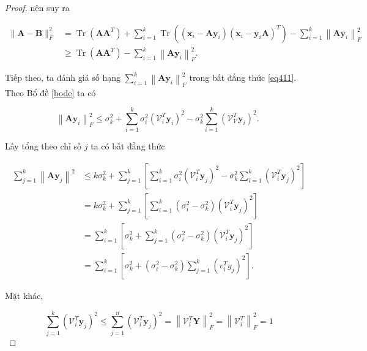 \documentclass[14pt,oneside,a4paper]{report}
\numberwithin{equation}{section}
\begin{document}
\begin{proof}
nên suy ra

\begin{equation} \label{eq411}
	\begin{aligned}
		\|\mathbf{A}-\mathbf{B}\|_{F}^{2} & =\operatorname{Tr}\left(\mathbf{A} \mathbf{A}^{T}\right)+\sum_{i=1}^{k} \operatorname{Tr}\left(\left(\mathbf{x}_{i}-\mathbf{A} \mathbf{y}_{i}\right)\left(\mathbf{x}_{i}-\mathbf{y}_{i} \mathbf{A}\right)^{T}\right)-\sum_{i=1}^{k}\left\|\mathbf{A y}_{i}\right\|_{F}^{2} \\
		& \geqslant \operatorname{Tr}\left(\mathbf{A} \mathbf{A}^{T}\right)-\sum_{i=1}^{k}\left\|\mathbf{A y}_{i}\right\|_{F}^{2} .
	\end{aligned}
\end{equation}

Tiếp theo, ta đánh giá số hạng $\sum_{i=1}^{k}\left\|\mathbf{A y}_{i}\right\|_{F}^{2}$ trong bất đẳng thức \ref{eq411}. Theo Bổ đề \ref{bode} ta có

$$
\left\|\mathbf{A y}_{i}\right\|_{F}^{2} \leqslant \sigma_{k}^{2}+\sum_{i=1}^{k} \sigma_{i}^{2}\left(\mathcal{V}_{i}^{T} \mathbf{y}_{i}\right)^{2}-\sigma_{k}^{2} \sum_{i=1}^{k}\left(\mathcal{V}_{\mathcal{V}}^{T} \mathbf{y}_{i}\right)^{2} \text {. }
$$

Lấy tổng theo chỉ số $j$ ta có bất đẳng thức

$$
\begin{aligned}
	\sum_{j=1}^{k}\left\|\mathbf{A y}_{j}\right\|^{2} & \leqslant k \sigma_{k}^{2}+\sum_{j=1}^{k}\left[\sum_{i=1}^{k} \sigma_{i}^{2}\left(\mathcal{V}_{i}^{T} \mathbf{y}_{j}\right)^{2}-\sigma_{k}^{2} \sum_{i=1}^{k}\left(\mathcal{V}_{i}^{T} \mathbf{y}_{j}\right)^{2}\right] \\
	& =k \sigma_{k}^{2}+\sum_{j=1}^{k}\left[\sum_{i=1}^{k}\left(\sigma_{i}^{2}-\sigma_{k}^{2}\right)\left(\mathcal{V}_{i}^{T} \mathbf{y}_{j}\right)^{2}\right] \\
	& =\sum_{i=1}^{k}\left[\sigma_{k}^{2}+\sum_{j=1}^{k}\left(\sigma_{i}^{2}-\sigma_{k}^{2}\right)\left(\mathcal{V}_{i}^{T} \mathbf{y}_{j}\right)^{2}\right] \\
	& =\sum_{i=1}^{k}\left[\sigma_{k}^{2}+\left(\sigma_{i}^{2}-\sigma_{k}^{2}\right) \sum_{j=1}^{k}\left(v_{i}^{T} y_{j}\right)^{2}\right] .
\end{aligned}
$$

Mặt khác,

$$
\sum_{j=1}^{k}\left(\mathcal{V}_{i}^{T} \mathbf{y}_{j}\right)^{2} \leqslant \sum_{j=1}^{n}\left(\mathcal{V}_{i}^{T} \mathbf{y}_{j}\right)^{2}=\left\|\mathcal{V}_{i}^{T} \mathbf{Y}\right\|_{F}^{2}=\left\|\mathcal{V}_{i}^{T}\right\|_{F}^{2}=1
$$


\end{proof}
\end{document}
